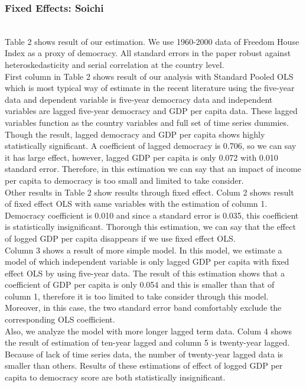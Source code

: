\subsubsection{Fixed Effects: Soichi}
\\
Table 2 shows result of our estimation. We use 1960-2000 data of Freedom House Index as a proxy of democracy. All standard errors in the paper robust against heteroskedasticity and serial correlation at the country level.\\
First column in Table 2 shows result of our analysis with Standard Pooled OLS which is most typical way of estimate in the recent literature using the five-year data and dependent variable is five-year democracy data and independent variables are lagged five-year democracy and GDP per capita data. These lagged variables function as the country variables and full set of time series dummies. Though the result, lagged democracy and GDP per capita shows highly statistically significant. A coefficient of lagged democracy is 0.706, so we can say it has large effect, however, lagged GDP per capita is only 0.072 with 0.010 standard error. Therefore, in this estimation we can say that an impact of income per capita to democracy is too small and limited to take consider. \\
Other results in Table 2 show results through fixed effect. Colum 2 shows result of fixed effect OLS with same variables with the estimation of column 1. Democracy coefficient is 0.010 and since a standard error is 0.035, this coefficient is statistically insignificant. Thorough this estimation, we can say that the effect of logged GDP per capita disappears if we use fixed effect OLS.  \\
Column 3 shows a result of more simple model. In this model, we estimate a model of which independent variable is only lagged GDP per capita with fixed effect OLS by using five-year data. The result of this estimation shows that a coefficient of GDP per capita is only 0.054 and this is smaller than that of column 1, therefore it is too limited to take consider through this model. Moreover, in this case, the two standard error band comfortably exclude the corresponding OLS coefficient.\\
Also, we analyze the model with more longer lagged term data. Colum 4 shows the result of estimation of ten-year lagged and column 5 is twenty-year lagged. Because of lack of time series data, the number of twenty-year lagged data is smaller than others. Results of these estimations of effect of logged GDP per capita to democracy score are both statistically insignificant.\\
